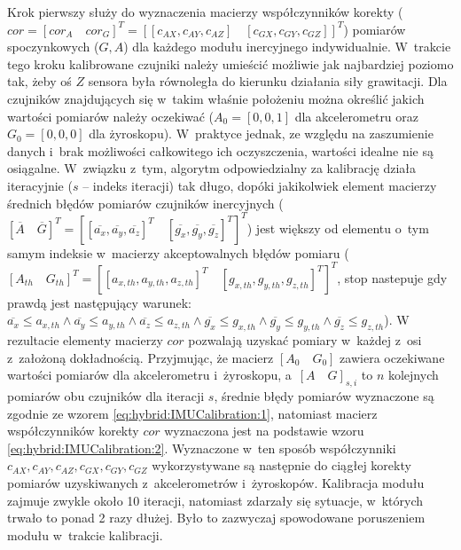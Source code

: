 Krok pierwszy służy do wyznaczenia macierzy współczynników korekty ($cor = [cor_A \quad cor_G]^T = [[c_{AX},c_{AY},c_{AZ}]\quad[c_{GX},c_{GY},c_{GZ}]]^T $) pomiarów spoczynkowych ($G, A$) dla każdego modułu inercyjnego indywidualnie. W~trakcie tego kroku kalibrowane czujniki należy umieścić możliwie jak najbardziej poziomo tak, żeby oś $Z$ sensora była równoległa do kierunku działania siły grawitacji. Dla czujników znajdujących się w~takim właśnie położeniu można określić jakich wartości pomiarów należy oczekiwać ($A_0 = [0,0,1]$ dla akcelerometru oraz $G_0 = [0,0,0]$ dla żyroskopu). W~praktyce jednak, ze względu na zaszumienie danych i~brak możliwości całkowitego ich oczyszczenia, wartości idealne nie są osiągalne. W~związku z~tym, algorytm odpowiedzialny za kalibrację działa iteracyjnie ($s$ -- indeks iteracji) tak długo, dopóki jakikolwiek element macierzy średnich błędów pomiarów czujników inercyjnych ($[\overline{A}\quad \overline{G}]^T = [[\overline{a_x},\overline{a_y},\overline{a_z}]^T\quad[\overline{g_x},\overline{g_y},\overline{g_z}]^T]^T$) jest większy od elementu o~tym samym indeksie w~macierzy akceptowalnych błędów pomiaru ($[A_{th}\quad G_{th}]^T = [[a_{x,th},a_{y,th},a_{z,th}]^T\quad[g_{x,th},g_{y,th},g_{z,th}]^T]^T $, stop nastepuje gdy prawdą jest następujący warunek: $\overline{a_x}\leq a_{x,th} \land \overline{a_y} \leq a_{y,th} \land \overline{a_z} \leq a_{z,th} \land \overline{g_x} \leq g_{x,th} \land \overline{g_y} \leq g_{y,th} \land \overline{g_z} \leq g_{z,th}$). W rezultacie elementy macierzy $cor$ pozwalają uzyskać pomiary w~każdej z~osi z~założoną dokładnością. Przyjmując, że macierz $[A_0\quad G_0]$ zawiera oczekiwane wartości pomiarów dla akcelerometru i~żyroskopu, a~$[A\quad G]_{s,i}$ to $n$ kolejnych pomiarów obu czujników dla iteracji $s$, średnie błędy pomiarów wyznaczone są zgodnie ze wzorem \ref{eq:hybrid:IMUCalibration:1}, natomiast macierz współczynników korekty $cor$ wyznaczona jest na podstawie wzoru \ref{eq:hybrid:IMUCalibration:2}. Wyznaczone w~ten sposób współczynniki $c_{AX},c_{AY},c_{AZ},c_{GX},c_{GY},c_{GZ}$ wykorzystywane są następnie do ciągłej korekty pomiarów uzyskiwanych z~akcelerometrów i~żyroskopów. Kalibracja modułu zajmuje zwykle około 10 iteracji, natomiast zdarzały się sytuacje, w~których trwało to ponad 2 razy dłużej. Było to zazwyczaj spowodowane poruszeniem modułu w~trakcie kalibracji.
		
